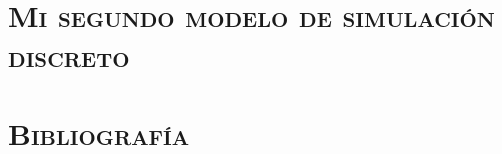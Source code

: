 \documentclass[12pt,a4paper]{article}
\begin{document}
	
	
	\tableofcontents
	
	\ \\ \\
	
	\newpage
	
	\setlength{\parindent}{0pt}
	
	\section{\textsc{Mi segundo modelo de simulación discreto}}
	
	
	\section{\textsc{Bibliografía}}
	

	
	
\end{document}
